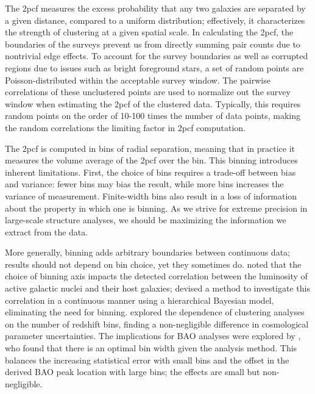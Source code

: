 \documentclass[modern]{aastex62}
\newcommand{\cf}{2pcf\xspace} %
\begin{document}
The \cf measures the excess probability that any two galaxies are separated by a given distance, compared to a uniform distribution; effectively, it characterizes the strength of clustering at a given spatial scale. 
In calculating the \cf, the boundaries of the surveys prevent us from directly summing pair counts due to nontrivial edge effects.
To account for the survey boundaries as well as corrupted regions due to issues such as bright foreground stars, a set of random points are Poisson-distributed within the acceptable survey window. 
The pairwise correlations of these unclustered points are used to normalize out the survey window when estimating the \cf of the clustered data.
Typically, this requires random points on the order of 10-100 times the number of data points, making the random correlations the limiting factor in \cf computation.

The \cf is computed in bins of radial separation, meaning that in practice it measures the volume average of the \cf over the bin. %
This binning introduces inherent limitations.
First, the choice of bins requires a trade-off between bias and variance: fewer bins may bias the result, while more bins increases the variance of measurement.
Finite-width bins also result in a loss of information about the property in which one is binning.
As we strive for extreme precision in large-scale structure analyses, we should be maximizing the information we extract from the data.

More generally, binning adds arbitrary boundaries between continuous data; results should not depend on bin choice, yet they sometimes do.
\cite{Lanzuisi2017} noted that the choice of binning axis impacts the detected correlation between the luminosity of active galactic nuclei and their host galaxies; \cite{Grimmett2020} devised a method to investigate this correlation in a continuous manner using a hierarchical Bayesian model, eliminating the need for binning.
\cite{Bailoni2016} explored the dependence of clustering analyses on the number of redshift bins, finding a non-negligible difference in cosmological parameter uncertainties.
The implications for BAO analyses were explored by \citep{Percival2014}, who found that there is an optimal bin width given the analysis method.
This balances the increasing statistical error with small bins and the offset in the derived BAO peak location with large bins; the effects are small but non-negligible.
\end{document}
